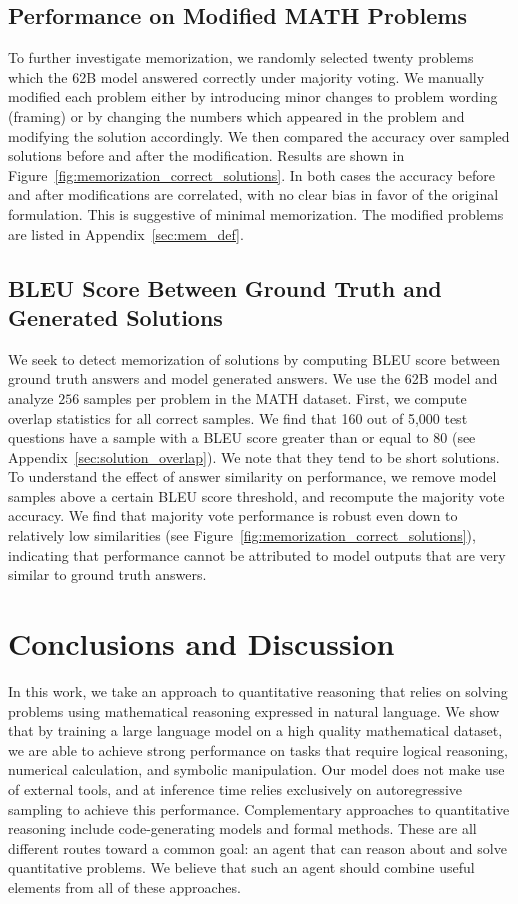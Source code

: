 \subsection{Performance on Modified MATH Problems} To further investigate memorization, we randomly selected twenty problems which the 62B model answered correctly under majority voting. We manually modified each problem either by introducing minor changes to problem wording (framing) or by changing the numbers which appeared in the problem and modifying the solution accordingly. We then compared the accuracy over sampled solutions before and after the modification. Results are shown in Figure~\ref{fig:memorization_correct_solutions}. In both cases the accuracy before and after modifications are correlated, with no clear bias in favor of the original formulation. This is suggestive of minimal memorization. The modified problems are listed in Appendix~\ref{sec:mem_def}.

\subsection{BLEU Score Between Ground Truth and Generated Solutions}

We seek to detect memorization of solutions by computing BLEU score between ground truth answers and model generated answers. We use the 62B model and analyze $256$ samples per problem in the MATH dataset.  First, we compute overlap statistics for all correct samples. We find that 160 out of 5,000 test questions have a sample with a BLEU score greater than or equal to 80 (see Appendix~\ref{sec:solution_overlap}). 
We note that they tend to be short solutions. To understand the effect of answer similarity on performance, we remove model samples above a certain BLEU score threshold, and recompute the majority vote accuracy. We find that majority vote performance is robust even down to relatively low similarities (see Figure~\ref{fig:memorization_correct_solutions}), indicating that performance cannot be attributed to model outputs that are very similar to ground truth answers.

\section{Conclusions and Discussion}
\label{sec:conclusion}
In this work, we take an approach to quantitative reasoning that relies on solving problems using mathematical reasoning expressed in natural language. We show that by training a large language model on a high quality mathematical dataset, we are able to achieve strong performance on tasks that require logical reasoning, numerical calculation, and symbolic manipulation. Our model does not make use of external tools, and at inference time relies exclusively on autoregressive sampling to achieve this performance. Complementary approaches to quantitative reasoning include code-generating models and formal methods. These are all different routes toward a common goal: an agent that can reason about and solve quantitative problems. We believe that such an agent should combine useful elements from all of these approaches. 


